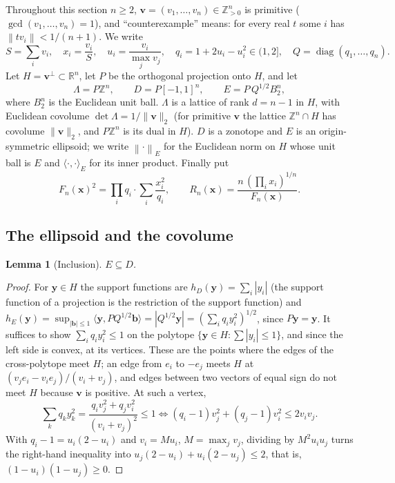 \documentclass[11pt]{article}
\newtheorem{lemma}[theorem]{Lemma}
\theoremstyle{definition}
\theoremstyle{remark}
\newcommand{\Z}{\mathbb{Z}}
\newcommand{\R}{\mathbb{R}}
\newcommand{\vct}[1]{\mathbf{#1}}
\newcommand{\nearest}[1]{\left\lVert #1\right\rVert}
\newcommand{\Enorm}[1]{\left\lVert #1\right\rVert_{E}}
\begin{document}
Throughout this section $n\geq2$, $\vct{v}=(v_1,\ldots,v_n)\in\Z_{>0}^n$ is
primitive ($\gcd(v_1,\ldots,v_n)=1$), and ``counterexample'' means: for
every real $t$ some $i$ has $\nearest{tv_i}<1/(n+1)$.  We write
\[
  S=\sum_iv_i,\quad x_i=\frac{v_i}{S},\quad
  u_i=\frac{v_i}{\max_jv_j},\quad
  q_i=1+2u_i-u_i^2\in(1,2],\quad Q=\operatorname{diag}(q_1,\ldots,q_n).
\]
Let $H=\vct{v}^{\perp}\subset\R^n$, let $P$ be the orthogonal projection
onto $H$, and let
\[
  \Lambda=P\Z^n,\qquad D=P[-1,1]^n,\qquad E=P\,Q^{1/2}B_2^n,
\]
where $B_2^n$ is the Euclidean unit ball.  $\Lambda$ is a lattice of rank
$d=n-1$ in $H$, with Euclidean covolume $\det\Lambda=1/\lVert\vct{v}\rVert_2$
(for primitive $\vct{v}$ the lattice $\Z^n\cap H$ has covolume
$\lVert\vct{v}\rVert_2$, and $P\Z^n$ is its dual in $H$).  $D$ is a zonotope
and $E$ is an origin-symmetric ellipsoid; we write $\Enorm{\cdot}$ for the
Euclidean norm on $H$ whose unit ball is $E$ and
$\langle\cdot,\cdot\rangle_E$ for its inner product.  Finally put
\begin{equation}\label{eq:F}
  F_n(\vct{x})^2=\prod_iq_i\cdot\sum_i\frac{x_i^2}{q_i},
  \qquad
  R_n(\vct{x})=\frac{n\,(\prod_ix_i)^{1/n}}{F_n(\vct{x})}.
\end{equation}

\subsection{The ellipsoid and the covolume}

\begin{lemma}[Inclusion]\label{lem:incl}
$E\subseteq D$.
\end{lemma}

\begin{proof}
For $\vct{y}\in H$ the support functions are $h_D(\vct{y})=\sum_i|y_i|$
(the support function of a projection is the restriction of the support
function) and $h_E(\vct{y})=\sup_{|\vct{b}|\leq1}\langle
\vct{y},PQ^{1/2}\vct{b}\rangle=|Q^{1/2}\vct{y}|=(\sum_iq_iy_i^2)^{1/2}$,
since $P\vct{y}=\vct{y}$.  It suffices to show $\sum_iq_iy_i^2\leq1$ on
the polytope $\{\vct{y}\in H:\sum|y_i|\leq1\}$, and since the left side
is convex, at its vertices.  These are the points where the edges of the
cross-polytope meet $H$; an edge from $e_i$ to $-e_j$ meets $H$ at
$(v_je_i-v_ie_j)/(v_i+v_j)$, and edges between two vectors of equal sign
do not meet $H$ because $\vct{v}$ is positive.  At such a vertex,
\[
  \sum_kq_ky_k^2=\frac{q_iv_j^2+q_jv_i^2}{(v_i+v_j)^2}\leq1
  \iff (q_i-1)v_j^2+(q_j-1)v_i^2\leq2v_iv_j .
\]
With $q_i-1=u_i(2-u_i)$ and $v_i=Mu_i$, $M=\max_jv_j$, dividing by
$M^2u_iu_j$ turns the right-hand inequality into
$u_j(2-u_i)+u_i(2-u_j)\leq2$, that is, $(1-u_i)(1-u_j)\geq0$.
\end{proof}
\end{document}
